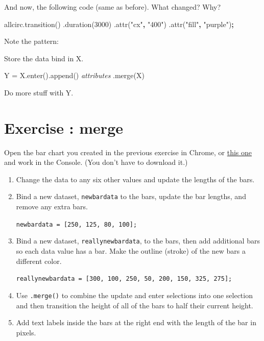 \documentclass[openany]{book}
\newenvironment{Shaded}{\begin{snugshade}}{\end{snugshade}}
\newcommand{\AttributeTok}[1]{\textcolor[rgb]{0.77,0.63,0.00}{#1}}
\newcommand{\DecValTok}[1]{\textcolor[rgb]{0.00,0.00,0.81}{#1}}
\newcommand{\NormalTok}[1]{#1}
\newcommand{\OperatorTok}[1]{\textcolor[rgb]{0.81,0.36,0.00}{\textbf{#1}}}
\newcommand{\StringTok}[1]{\textcolor[rgb]{0.31,0.60,0.02}{#1}}
\newcommand{\VariableTok}[1]{\textcolor[rgb]{0.00,0.00,0.00}{#1}}
\begin{document}
And now, the following code (same as before). What changed? Why?

\begin{Shaded}
\begin{Highlighting}[]
\VariableTok{allcirc}\NormalTok{.}\AttributeTok{transition}\NormalTok{() }
\NormalTok{        .}\AttributeTok{duration}\NormalTok{(}\DecValTok{3000}\NormalTok{)}
\NormalTok{        .}\AttributeTok{attr}\NormalTok{(}\StringTok{"cx"}\OperatorTok{,} \StringTok{"400"}\NormalTok{)}
\NormalTok{        .}\AttributeTok{attr}\NormalTok{(}\StringTok{"fill"}\OperatorTok{,} \StringTok{"purple"}\NormalTok{)}\OperatorTok{;}
\end{Highlighting}
\end{Shaded}

Note the pattern:

Store the data bind in X.

Y = X.enter().append() \emph{attributes} .merge(X)

Do more stuff with Y.

\hypertarget{exercise-merge}{%
\section{Exercise : merge}\label{exercise-merge}}

Open the bar chart you created in the previous exercise in Chrome, or \href{code/horiz_bar.html}{this one} and work in the Console. (You don't have to download it.)

\begin{enumerate}
\def\labelenumi{\arabic{enumi}.}
\item
  Change the data to any six other values and update the lengths of the bars.
\item
  Bind a new dataset, \texttt{newbardata} to the bars, update the bar lengths, and remove any extra bars.

  \texttt{newbardata\ =\ {[}250,\ 125,\ 80,\ 100{]};}
\item
  Bind a new dataset, \texttt{reallynewbardata}, to the bars, then add additional bars so each data value has a bar. Make the outline (stroke) of the new bars a different color.

  \texttt{reallynewbardata\ =\ {[}300,\ 100,\ 250,\ 50,\ 200,\ 150,\ 325,\ 275{]};}
\item
  Use \texttt{.merge()} to combine the update and enter selections into one selection and then transition the height of all of the bars to half their current height.
\item
  Add text labels inside the bars at the right end with the length of the bar in pixels.
\end{enumerate}
\end{document}
